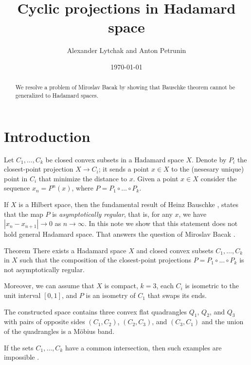 \documentclass[a4paper,10pt]{article}
\begin{document}
\title{Cyclic projections in Hadamard space}	
\author{Alexander Lytchak and Anton Petrunin}
\date{\today}
\maketitle

\begin{abstract}
We resolve a problem of Miroslav Bacak by showing that Bauschke theorem cannot be generalized to Hadamard spaces.
\end{abstract}



\section{Introduction}


Let  $C_1,\dots, C_k$ be closed convex subsets in a Hadamard space $X$.
Denote by $P_i$ the closest-point projection $X\to C_i$; it sends a point $x\in X$ to the (nesesary unique) point in $C_i$ that minimize the distance to $x$.
Given a point $x\in X$ consider the sequence $x_n=P^n(x)$, where
$P= P_1\circ \dots \circ P_k$.

If $X$ is a Hilbert space, then the fundamental result of Heinz Bauschke \cite{Bauschke,Kohlenbach}, states that the map $P$ is \emph{asymptotically regular}, that is, for any $x$, we have  $|x_n-x_{n+1}|\to0$ as $n\to \infty$.
In this note we show that this statement does not hold general Hadamard space.
That answers the question of Miroslav Bacak \cite[Problem 6.13]{Bac}.

\begin{thm}{Theorem}\label{thm}
There exists a Hadamard space $X$ and closed convex subsets $C_1,\dots,C_k$ in $X$ such that the composition of the closest-point projections $P= P_1\circ \dots \circ P_k$ is not asymptotically regular.

Moreover, we can assume that $X$ is compact, $k=3$, each $C_i$ is isometric to the unit interval $[0,1]$, 
and $P$ is an isometry of $C_1$ that swaps its ends.
\end{thm}

The constructed space contains three convex flat quadrangles $Q_1$, $Q_2$, and $Q_3$ with pairs of opposite sides $(C_1,C_2)$, $(C_2,C_3)$, and $(C_3,C_1)$ and the union of the quadrangles is a Möbius band.

If the sets $C_1,\dots,C_k$ have a common intersection, then such examples are impossible \cite{asymptotic,Bac2,Bac}.
\end{document}
